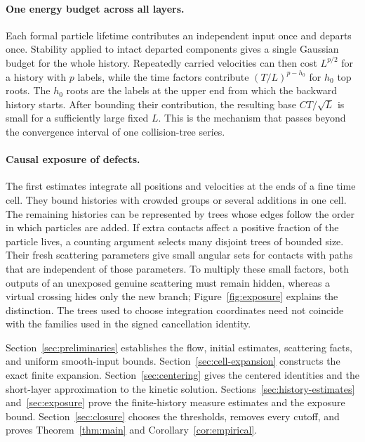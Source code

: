 \paragraph{One energy budget across all layers.}
Each formal particle lifetime contributes an independent input once
and departs once. Stability applied to intact departed components gives
a single Gaussian budget for the whole history. Repeatedly carried
velocities can then cost $L^{p/2}$ for a history with $p$ labels, while
the time factors contribute $(T/L)^{p-h_0}$ for $h_0$ top roots.
The $h_0$ roots are the labels at the upper end from which the
backward history starts. After bounding their contribution, the resulting
base
$CT/\sqrt L$ is small for a sufficiently large fixed $L$. This is the
mechanism that passes beyond the convergence interval of one
collision-tree series.

\paragraph{Causal exposure of defects.}
The first estimates integrate all positions and velocities at the
ends of a fine time cell. They bound histories with crowded groups or
several additions in one cell. The remaining histories can be represented
by trees whose edges follow the order in which particles are added.
If extra contacts affect a positive fraction of the particle lives,
a counting argument selects many disjoint trees of bounded size.
Their fresh scattering parameters give small angular sets for contacts
with paths that are independent of those parameters.
To multiply these small factors, both outputs of an unexposed genuine
scattering must remain hidden, whereas a virtual crossing hides only
the new branch; Figure~\ref{fig:exposure} explains the distinction.
The trees used to choose integration coordinates need not coincide
with the families used in the signed cancellation identity.



Section~\ref{sec:preliminaries} establishes the flow, initial estimates,
scattering facts, and uniform smooth-input bounds.
Section~\ref{sec:cell-expansion} constructs the exact finite expansion.
Section~\ref{sec:centering} gives the centered identities and the
short-layer approximation to the kinetic solution.
Sections~\ref{sec:history-estimates} and~\ref{sec:exposure} prove the
finite-history measure estimates and the exposure bound.
Section~\ref{sec:closure} chooses the thresholds, removes every cutoff,
and proves Theorem~\ref{thm:main} and Corollary~\ref{cor:empirical}.
